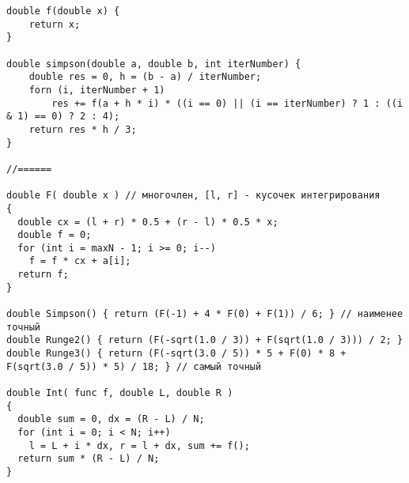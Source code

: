 \begin{verbatim}
double f(double x) {
	return x;
}	

double simpson(double a, double b, int iterNumber) {
	double res = 0, h = (b - a) / iterNumber;
	forn (i, iterNumber + 1)
		res += f(a + h * i) * ((i == 0) || (i == iterNumber) ? 1 : ((i & 1) == 0) ? 2 : 4);
	return res * h / 3;
}

//======

double F( double x ) // многочлен, [l, r] - кусочек интегрирования
{
  double cx = (l + r) * 0.5 + (r - l) * 0.5 * x;
  double f = 0;
  for (int i = maxN - 1; i >= 0; i--)
    f = f * cx + a[i];
  return f;
}

double Simpson() { return (F(-1) + 4 * F(0) + F(1)) / 6; } // наименее точный
double Runge2() { return (F(-sqrt(1.0 / 3)) + F(sqrt(1.0 / 3))) / 2; }
double Runge3() { return (F(-sqrt(3.0 / 5)) * 5 + F(0) * 8 + F(sqrt(3.0 / 5)) * 5) / 18; } // самый точный

double Int( func f, double L, double R )
{
  double sum = 0, dx = (R - L) / N;
  for (int i = 0; i < N; i++)
    l = L + i * dx, r = l + dx, sum += f();
  return sum * (R - L) / N;
}

\end{verbatim}
